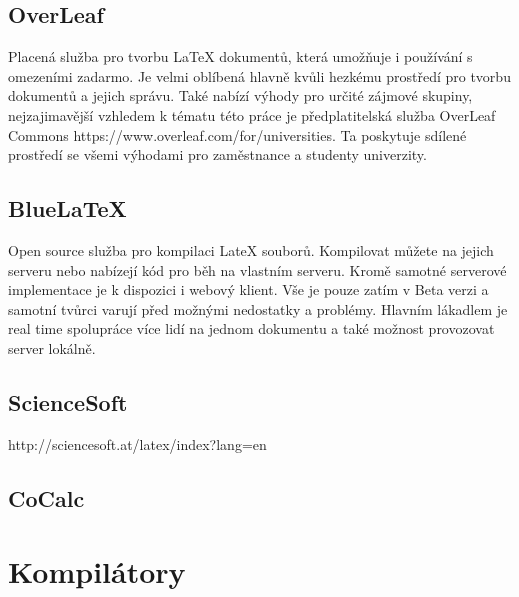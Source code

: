 \subsection{OverLeaf}
Placená služba pro tvorbu LaTeX dokumentů, která umožňuje i používání s omezeními zadarmo. Je velmi oblíbená hlavně kvůli hezkému prostředí pro tvorbu dokumentů a jejich správu. Také nabízí výhody pro určité zájmové skupiny, nejzajimavější vzhledem k tématu této práce je předplatitelská služba OverLeaf Commons https://www.overleaf.com/for/universities. Ta poskytuje sdílené prostředí se všemi výhodami pro zaměstnance a studenty univerzity.

\subsection{BlueLaTeX}
Open source služba pro kompilaci LateX souborů. Kompilovat můžete na jejich serveru nebo nabízejí kód pro běh na vlastním serveru. Kromě samotné serverové implementace je k dispozici i webový klient. Vše je pouze zatím v Beta verzi a samotní tvůrci varují před možnými nedostatky a problémy. Hlavním lákadlem je real time spolupráce více lidí na jednom dokumentu a také možnost provozovat server lokálně. 

\subsection{ScienceSoft}
http://sciencesoft.at/latex/index?lang=en 

\subsection{CoCalc}


\section{Kompilátory}


